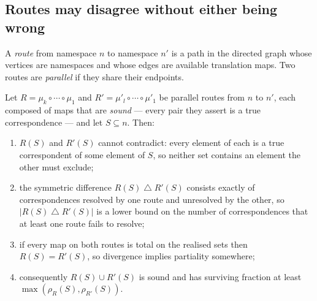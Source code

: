 \subsection{Routes may disagree without either being wrong}

\begin{definition}[Route]
\label{def:route}
A \emph{route} from namespace $n$ to namespace $n'$ is a path in the directed
graph whose vertices are namespaces and whose edges are available translation
maps. Two routes are \emph{parallel} if they share their endpoints.
\end{definition}

\begin{theorem}
\label{thm:route-extent}
Let $R = \mu_k \circ \cdots \circ \mu_1$ and $R' = \mu'_l \circ \cdots \circ \mu'_1$
be parallel routes from $n$ to $n'$, each composed of maps that are
\emph{sound} --- every pair they assert is a true correspondence --- and let
$S \subseteq n$. Then:
\begin{enumerate}[label=(\alph*),leftmargin=2.4em]
\item $R(S)$ and $R'(S)$ cannot contradict: every element of each is a true
correspondent of some element of $S$, so neither set contains an element the
other must exclude;
\item the symmetric difference $R(S) \bigtriangleup R'(S)$ consists exactly of
correspondences resolved by one route and unresolved by the other, so
$|R(S) \bigtriangleup R'(S)|$ is a lower bound on the number of correspondences
that at least one route fails to resolve;
\item if every map on both routes is total on the realised sets then
$R(S) = R'(S)$, so divergence implies partiality somewhere;
\item consequently $R(S) \cup R'(S)$ is sound and has surviving fraction at
least $\max(\rho_R(S), \rho_{R'}(S))$.
\end{enumerate}
\end{theorem}

